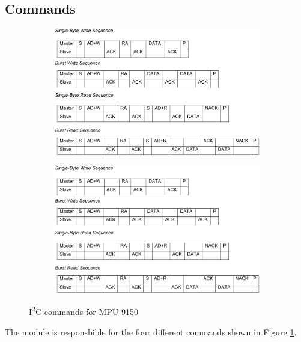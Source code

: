 \documentclass{article}
\begin{document}
\subsection{Commands}
\begin{figure}[h!]
	\centering
	\begin{subfigure}{0.5\textwidth}
		\includegraphics[width=\textwidth, page=1]{i2c}
	\end{subfigure}
	\quad
	\begin{subfigure}{0.4\textwidth}
		\includegraphics[width=\textwidth, page=2]{i2c}
	\end{subfigure}
	\caption{I\textsuperscript{2}C commands for MPU-9150\protect\footnotemark}
	\label{i2c}
\end{figure}
The module is responsbible for the four different commands shown in Figure \ref{i2c}. 
\end{document}
